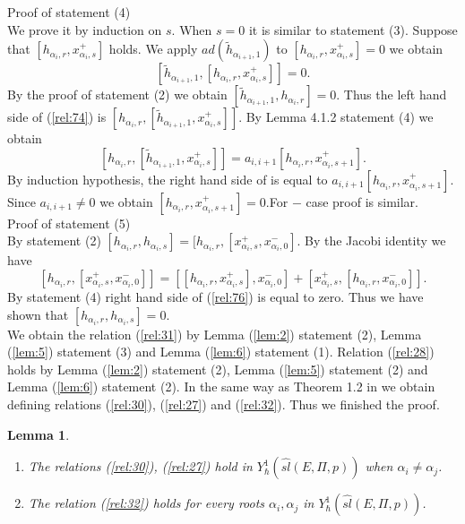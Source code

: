 \documentclass[english]{elsarticle}
\newtheorem{lemma}{Lemma}[section]
\numberwithin{equation}{section}
\begin{document}
Proof of statement (4)\\
We prove it by induction on $s$. When $s=0$ it is similar to statement (3). Suppose that $[h_{\alpha_i,r},x_{\alpha_i,s}^+]$ holds. We apply $ad(\tilde{h}_{\alpha_{i+1},1})$ to $[h_{\alpha_i,r},x_{\alpha_i,s}^+]=0$ we obtain
\begin{equation}
\label{rel:74}
    [\tilde{h}_{\alpha_{i+1},1},[h_{\alpha_i,r},x_{\alpha_i,s}^+]]=0.
\end{equation}
By the proof of statement (2) we obtain $[\tilde{h}_{\alpha_{i+1},1},h_{\alpha_i,r}]=0$. Thus the left hand side of (\ref{rel:74}) is $[{h}_{\alpha_{i},r},[\tilde{h}_{\alpha_{i+1},1},x_{\alpha_i,s}^+]]$. By Lemma 4.1.2 statement (4) we obtain
\begin{equation}
\label{rel:75}
    [{h}_{\alpha_{i},r},[\tilde{h}_{\alpha_{i+1},1},x_{\alpha_i,s}^+]]=a_{i,i+1}[h_{\alpha_i,r},x_{\alpha_i,s+1}^+].
\end{equation}
By induction hypothesis, the right hand side of is equal to $a_{i,i+1}[h_{\alpha_i,r},x_{\alpha_i,s+1}^+]$. Since $a_{i,i+1}\neq 0$ we obtain $[h_{\alpha_i,r},x_{\alpha_i,s+1}^+]=0$.For $-$ case proof is similar.\\
Proof of statement (5)\\
By statement (2) $[h_{\alpha_i,r},h_{\alpha_i,s}]=[h_{\alpha_i,r},[x_{\alpha_i,s}^+,x_{\alpha_i,0}^-]$. By the Jacobi identity we have
\begin{equation}
\label{rel:76}
[h_{\alpha_i,r},[x_{\alpha_i,s}^+,x_{\alpha_i,0}^-]]= [[h_{\alpha_i,r},x_{\alpha_i,s}^+], x_{\alpha_i,0}^-]+ [x_{\alpha_i,s}^+,[h_{\alpha_i,r},x_{\alpha_i,0}^-]].
\end{equation}
By statement (4) right hand side of (\ref{rel:76}) is equal to zero. Thus we have shown that $[h_{\alpha_i,r},h_{\alpha_i,s}]=0$.\\
We obtain the relation (\ref{rel:31}) by Lemma (\ref{lem:2}) statement (2), Lemma  (\ref{lem:5}) statement (3) and Lemma (\ref{lem:6}) statement (1). Relation (\ref{rel:28}) holds by Lemma (\ref{lem:2}) statement (2), Lemma (\ref{lem:5}) statement (2) and Lemma (\ref{lem:6}) statement (2). In the same way as Theorem 1.2 in \cite{Levendorski} we obtain defining relations (\ref{rel:30}), (\ref{rel:27}) and (\ref{rel:32}). Thus we finished the proof.


\begin{lemma} \label{lem:7}
\begin{enumerate}
\item The relations (\ref{rel:30}), (\ref{rel:27}) hold in $Y_{\hbar}^1(\hat{sl}(E,\Pi,p))$ when $\alpha_i\neq \alpha_j$.
\item The relation (\ref{rel:32}) holds for every roots $\alpha_i, \alpha_j$ in $Y_{\hbar}^1(\hat{sl}(E,\Pi,p))$.
\end{enumerate}
\end{lemma}
\end{document}
